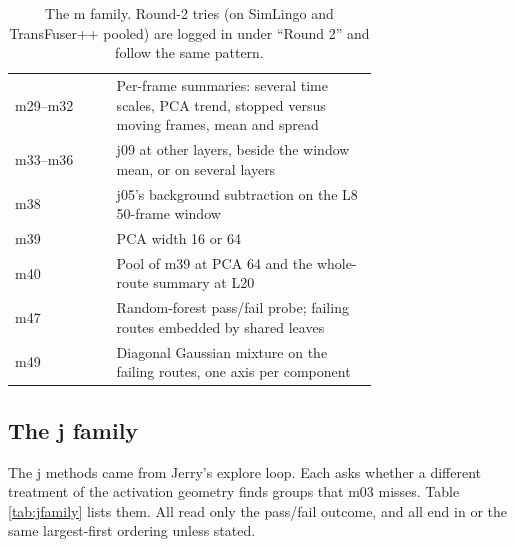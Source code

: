 \begin{table}[t]
\begin{tabular}{@{}lp{0.72\linewidth}@{}}
m29--m32 & Per-frame summaries: several time scales, PCA trend, stopped versus
           moving frames, mean and spread \\
m33--m36 & j09 at other layers, beside the window mean, or on several layers \\
m38      & j05's background subtraction on the L8 50-frame window \\
m39      & PCA width 16 or 64 \\
m40      & Pool of m39 at PCA 64 and the whole-route summary at L20 \\
m47      & Random-forest pass/fail probe; failing routes embedded by shared leaves \\
m49      & Diagonal Gaussian mixture on the failing routes, one axis per component \\
\bottomrule
\end{tabular}
\caption{The m family. Round-2 tries (on SimLingo and TransFuser++ pooled) are
logged in  under ``Round 2'' and follow the same pattern.}
\label{tab:mfamily}
\end{table}

\subsection{The j family}
\label{sec:jfamily}

The j methods came from Jerry's explore loop. Each asks whether a different
treatment of the activation geometry finds groups that m03 misses. Table
\ref{tab:jfamily} lists them. All read only the pass/fail outcome, and all end
in  or the same largest-first ordering unless stated.

